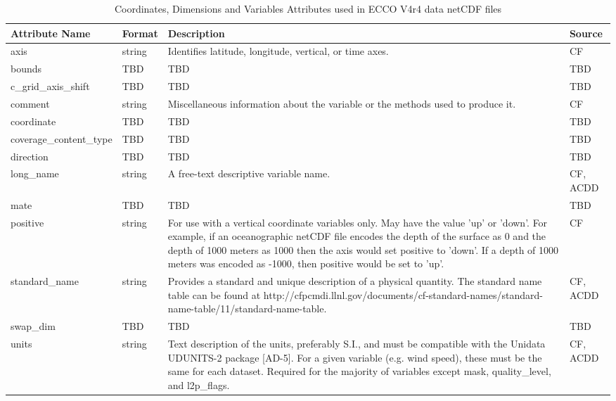 \begin{longtable}{|p{}|p{}|p{}|p{}|}
\caption{Coordinates, Dimensions and Variables Attributes used in ECCO V4r4 data netCDF files}
\label{tab:variable-attributes} \\ 
\hline \endfirsthead
\endhead
\endfoot
\hline \endlastfoot
\rowcolor{blue!25} \textbf{Attribute Name} & \textbf{Format} & \textbf{Description} & \textbf{Source} \\ \hline
\rowcolor{violet!25}
axis & string & Identifies latitude, longitude, vertical, or time axes. & CF \\ \hline
\rowcolor{violet!25}
bounds & TBD & TBD & TBD \\ \hline
\rowcolor{violet!25}
c\_grid\_axis\_shift & TBD & TBD & TBD \\ \hline
\rowcolor{violet!25}
comment & string & Miscellaneous information about the variable or the methods used to produce it. & CF \\ \hline
\rowcolor{violet!25}
coordinate & TBD & TBD & TBD \\ \hline
\rowcolor{violet!25}
coverage\_content\_type & TBD & TBD & TBD \\ \hline
\rowcolor{violet!25}
direction & TBD & TBD & TBD \\ \hline
\rowcolor{violet!25}
long\_name & string & A free-text descriptive variable name. & CF, ACDD \\ \hline
\rowcolor{violet!25}
mate & TBD & TBD & TBD \\ \hline
\rowcolor{violet!25}
positive & string & For use with a vertical coordinate variables only. May have the value 'up' or 'down'. For example, if an oceanographic netCDF file encodes the depth of the surface as 0 and the depth of 1000 meters as 1000 then the axis would set positive to 'down'. If a depth of 1000 meters was encoded as -1000, then positive would be set to 'up'. & CF \\ \hline
\rowcolor{violet!25}
standard\_name & string & Provides a standard and unique description of a physical quantity. The standard name table can be found at http://cfpcmdi.llnl.gov/documents/cf-standard-names/standard-name-table/11/standard-name-table. & CF, ACDD \\ \hline
\rowcolor{violet!25}
swap\_dim & TBD & TBD & TBD \\ \hline
\rowcolor{violet!25}
units & string & Text description of the units, preferably S.I., and must be compatible with the Unidata UDUNITS-2 package [AD-5]. For a given variable (e.g. wind speed), these must be the same for each dataset. Required for the majority of variables except mask, quality\_level, and l2p\_flags. & CF, ACDD \\ \hline

\end{longtable}
